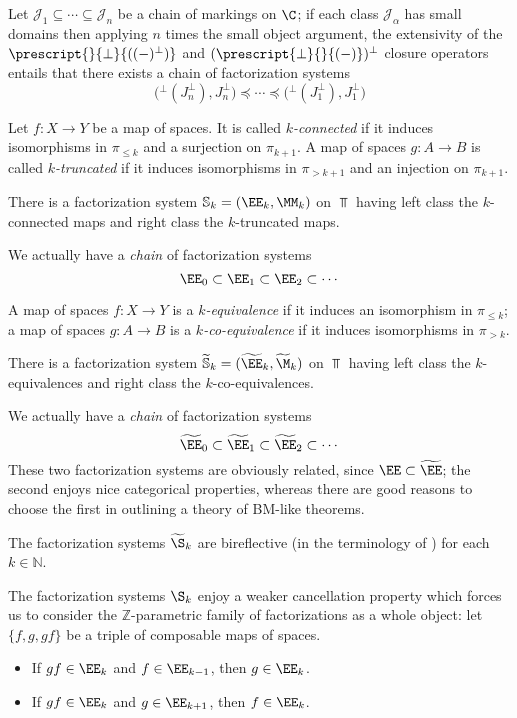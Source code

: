 \documentclass[10pt,a4paper]{amsart}
\begin{document}
\begin{theorem}
Let $\mathcal{J}_1\subseteq \cdots \subseteq \mathcal{J}_n$ be a chain of markings on $\C$; if each class $\mathcal{J}_\alpha$ has small domains then applying $n$ times the small object argument, the extensivity of the $\prescript{}{\perp}{((-)^\perp)}$ and $(\prescript{\perp}{}{(-)})^\perp$ closure operators entails that there exists a chain of factorization systems
\[
\big({}^\perp(J_n^\perp),J_n^\perp \big) \preceq \cdots \preceq \big({}^\perp(J_1^\perp),J_1^\perp \big)
\]
\end{theorem}

\hrulefill

\begin{definition}
Let $f\colon X\to Y$ be a map of spaces. It is called \emph{$k$-connected} if it induces isomorphisms in $\pi_{\le k}$ and a surjection on $\pi_{k+1}$. A map of spaces $g\colon A\to B$ is called \emph{$k$-truncated} if it induces isomorphisms in $\pi_{> k+1}$ and an injection on $\pi_{k+1}$.
\end{definition}
\begin{proposition}
There is a factorization system $\mathbb{S}_k = (\EE_k,\MM_k)$ on $\Top$ having left class the $k$-connected maps and right class the $k$-truncated maps.
\end{proposition}
We actually have a \emph{chain} of factorization systems
\[
\EE_0\subset \EE_1\subset \EE_2\subset\cdots
\]
\begin{definition}
A map of spaces $f\colon X\to Y$ is a \emph{$k$-equivalence} if it induces an isomorphism in $\pi_{\le k}$; a map of spaces $g\colon A\to B$ is a \emph{$k$-co-equivalence} if it induces isomorphisms in $\pi_{ > k}$.
\end{definition}
\begin{proposition}
There is a factorization system $\widetilde{\mathbb{S}}_k = (\widetilde{\EE}_k,\widetilde{\M}_k)$ on $\Top$ having left class the $k$-equivalences and right class the $k$-co-equivalences.
\end{proposition}
We actually have a \emph{chain} of factorization systems
\[
\widetilde{\EE}_0\subset \widetilde{\EE}_1\subset \widetilde{\EE}_2\subset\cdots
\]
These two factorization systems are obviously related, since $\EE\subset \widetilde{\EE}$; the second enjoys nice categorical properties, whereas there are good reasons to choose the first in outlining a theory of BM-like theorems.
\begin{remark}
The factorization systems $\widetilde{\S}_k$ are bireflective (in the terminology of \cite{Fiorenza2014}) for each $k\in\mathbb N$.

The factorization systems $\S_k$ enjoy a weaker cancellation property which forces us to consider the $\mathbb{Z}$-parametric family of factorizations as a whole object: let $\{f,g,gf\}$ be a triple of composable maps of spaces.
\begin{itemize}
\item If $gf\in\EE_k$ and $f\in\EE_{k-1}$, then $g\in \EE_k$.
\item If $gf\in\EE_k$ and $g\in\EE_{k+1}$, then $f\in \EE_k$.
\end{itemize}
\end{remark}
\end{document}
